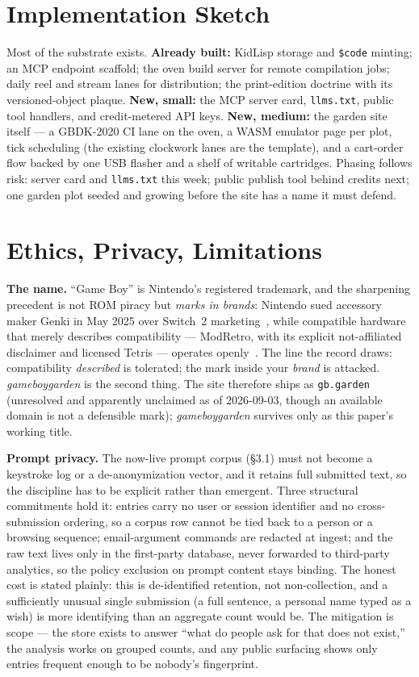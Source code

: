 \documentclass[10pt,letterpaper,twocolumn]{article}
\begin{document}
\section{Implementation Sketch}

Most of the substrate exists. \textbf{Already built:} KidLisp storage and \texttt{\$code} minting; an MCP endpoint scaffold; the oven build server for remote compilation jobs; daily reel and stream lanes for distribution; the print-edition doctrine with its versioned-object plaque. \textbf{New, small:} the MCP server card, \texttt{llms.txt}, public tool handlers, and credit-metered API keys. \textbf{New, medium:} the garden site itself --- a GBDK-2020 CI lane on the oven, a WASM emulator page per plot, tick scheduling (the existing clockwork lanes are the template), and a cart-order flow backed by one USB flasher and a shelf of writable cartridges. Phasing follows risk: server card and \texttt{llms.txt} this week; public publish tool behind credits next; one garden plot seeded and growing before the site has a name it must defend.

\section{Ethics, Privacy, Limitations}

\textbf{The name.} ``Game Boy'' is Nintendo's registered trademark, and the sharpening precedent is not ROM piracy but \emph{marks in brands}: Nintendo sued accessory maker Genki in May 2025 over Switch~2 marketing~\citep{notebookcheck2025genki}, while compatible hardware that merely describes compatibility --- ModRetro, with its explicit not-affiliated disclaimer and licensed Tetris --- operates openly~\citep{modretro2026faq}. The line the record draws: compatibility \emph{described} is tolerated; the mark inside your \emph{brand} is attacked. \emph{gameboygarden} is the second thing. The site therefore ships as \texttt{gb.garden} (unresolved and apparently unclaimed as of 2026-09-03, though an available domain is not a defensible mark); \emph{gameboygarden} survives only as this paper's working title.

\textbf{Prompt privacy.} The now-live prompt corpus (\S3.1) must not become a keystroke log or a de-anonymization vector, and it retains full submitted text, so the discipline has to be explicit rather than emergent. Three structural commitments hold it: entries carry no user or session identifier and no cross-submission ordering, so a corpus row cannot be tied back to a person or a browsing sequence; email-argument commands are redacted at ingest; and the raw text lives only in the first-party database, never forwarded to third-party analytics, so the policy exclusion on prompt content stays binding. The honest cost is stated plainly: this is de-identified retention, not non-collection, and a sufficiently unusual single submission (a full sentence, a personal name typed as a wish) is more identifying than an aggregate count would be. The mitigation is scope --- the store exists to answer ``what do people ask for that does not exist,'' the analysis works on grouped counts, and any public surfacing shows only entries frequent enough to be nobody's fingerprint.
\end{document}

